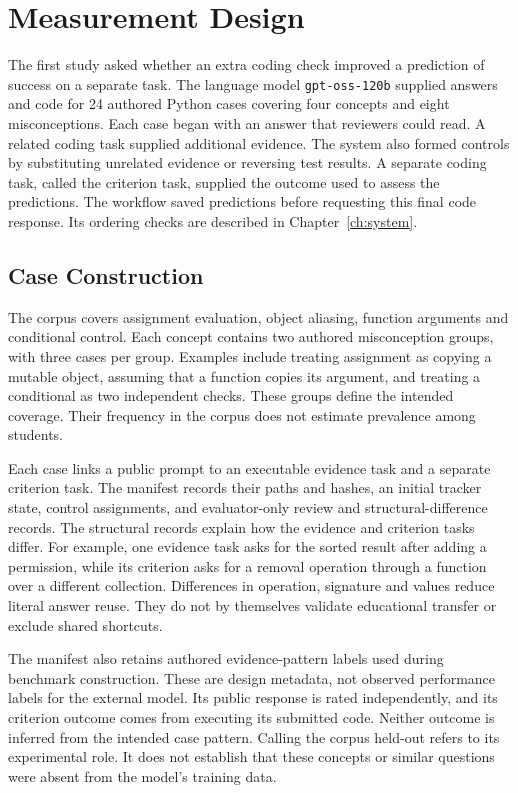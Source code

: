 \chapter{Measurement Design}
\label{ch:measurement}

The first study asked whether an extra coding check improved a prediction of success on a separate task. The language model
\texttt{gpt-oss-120b} supplied answers and code for 24 authored Python cases covering four concepts and eight misconceptions.
Each case began with an answer that reviewers could read. A related coding task supplied additional evidence. The system
also formed controls by substituting unrelated evidence or reversing test results. A separate coding task, called the criterion
task, supplied the outcome used to assess the predictions. The workflow saved predictions before requesting this final code
response. Its ordering checks are described in Chapter~\ref{ch:system}.

\section{Case Construction}

The corpus covers assignment evaluation, object aliasing, function arguments and conditional control. Each concept contains
two authored misconception groups, with three cases per group. Examples include treating assignment as copying a mutable
object, assuming that a function copies its argument, and treating a conditional as two independent checks. These groups
define the intended coverage. Their frequency in the corpus does not estimate prevalence among students.

Each case links a public prompt to an executable evidence task and a separate criterion task. The manifest records their
paths and hashes, an initial tracker state, control assignments, and evaluator-only review and structural-difference records.
The structural records explain how the evidence and criterion tasks differ. For example, one evidence task asks for the sorted
result after adding a permission, while its criterion asks for a removal operation through a function over a different
collection. Differences in operation, signature and values reduce literal answer reuse. They do not by themselves validate
educational transfer or exclude shared shortcuts.

The manifest also retains authored evidence-pattern labels used during benchmark construction. These are design metadata,
not observed performance labels for the external model. Its public response is rated independently, and its criterion outcome
comes from executing its submitted code. Neither outcome is inferred from the intended case pattern. Calling the corpus
held-out refers to its experimental role. It does not establish that these concepts or similar questions were absent from
the model's training data.

